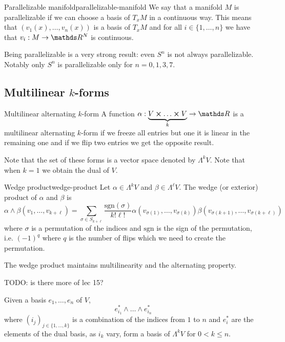 \documentclass[12pt]{extarticle}
\begin{document}
\begin{definition}{Parallelizable manifold}{parallelizable-manifold}
	We say that a manifold $M$ is parallelizable if we can choose a basis of $T_x M$ in a continuous
	way.
	This means that $(v_1(x), \dots, v_n(x))$ is a basis of $T_x M$ and for all
	$i \in \{1, \dots, n\}$ we have that $v_i: M \to \R^N$ is continuous.
\end{definition}

Being parallelizable is a very strong result: even $S^n$ is not always parallelizable. Notably only
$S^n$ is parallelizable only for $n = 0, 1, 3, 7$.

\subsection{Multilinear \texorpdfstring{$k$}{k}-forms}

\begin{definition}{Multilinear alternating $k$-form}{}
	A function $\alpha: \underbrace{V \cross \dots \cross V}_k \to \R$ is a multilinear alternating
	$k$-form if we freeze all entries but one it is linear in the remaining one and if we flip two
	entries we get the opposite result.
\end{definition}

Note that the set of these forms is a vector space denoted by $\Lambda^k V$. Note that when $k = 1$
we obtain the dual of $V$.

\begin{definition}{Wedge product}{wedge-product}
	Let $\alpha \in \Lambda^k V$ and $\beta \in \Lambda^\ell V$.
	The wedge (or exterior) product of $\alpha$ and $\beta$ is
	\begin{equation}
		\alpha \land \beta (v_1, \dots, v_{k+\ell}) = \sum_{\sigma \in S_{k+\ell}}
		\frac{\mathrm{sgn}(\sigma)}{k! \ell!} \alpha(v_{\sigma(1)}, \dots, v_{\sigma(k)})
		\beta(v_{\sigma(k+1)}, \dots, v_{\sigma(k+\ell)})
	\end{equation}
	where $\sigma$ is a permutation of the indices and $\mathrm{sgn}$ is the sign of the permutation,
	i.e. $(-1)^q$ where $q$ is the number of flips which we need to create the permutation.
\end{definition}

The wedge product maintains multilinearity and the alternating property.

TODO: is there more of lec 15?

\begin{proposition}{}{}
	Given a basis $e_1, \dots, e_n$ of $V$,
	\begin{equation}
		e_{i_1}^* \land \dots \land e_{i_n}^*
	\end{equation}
	where $(i_j)_{j \in \{ 1, \dots, k \}}$ is a combination of the indices from $1$ to $n$ and
	$e_i^*$ are the elements of the dual basis, as $i_k$ vary, form a basis of $\Lambda^k V$ for
	$0<k\leq n$.
\end{proposition}
\end{document}
